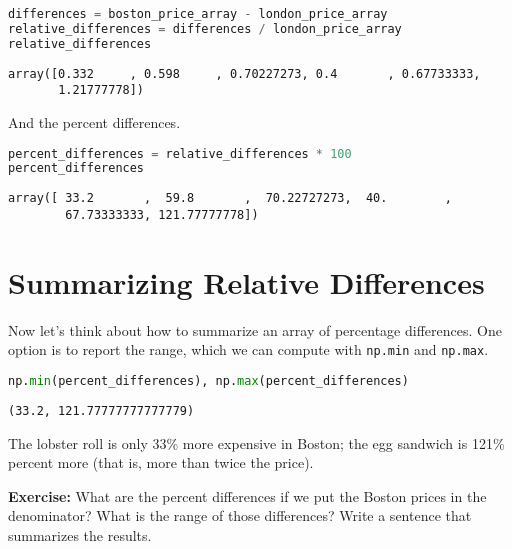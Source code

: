 \begin{lstlisting}[language=Python,style=source]
differences = boston_price_array - london_price_array
relative_differences = differences / london_price_array
relative_differences
\end{lstlisting}

\begin{lstlisting}[style=output]
array([0.332     , 0.598     , 0.70227273, 0.4       , 0.67733333,
       1.21777778])
\end{lstlisting}

And the percent differences.

\begin{lstlisting}[language=Python,style=source]
percent_differences = relative_differences * 100
percent_differences
\end{lstlisting}

\begin{lstlisting}[style=output]
array([ 33.2       ,  59.8       ,  70.22727273,  40.        ,
        67.73333333, 121.77777778])
\end{lstlisting}

\section{Summarizing Relative
Differences}\label{summarizing-relative-differences}

Now let's think about how to summarize an array of percentage
differences. One option is to report the range, which we can compute
with \passthrough{\lstinline!np.min!} and
\passthrough{\lstinline!np.max!}.

\begin{lstlisting}[language=Python,style=source]
np.min(percent_differences), np.max(percent_differences)
\end{lstlisting}

\begin{lstlisting}[style=output]
(33.2, 121.77777777777779)
\end{lstlisting}

The lobster roll is only 33\% more expensive in Boston; the egg sandwich
is 121\% percent more (that is, more than twice the price).

\textbf{Exercise:} What are the percent differences if we put the Boston
prices in the denominator? What is the range of those differences? Write
a sentence that summarizes the results.

